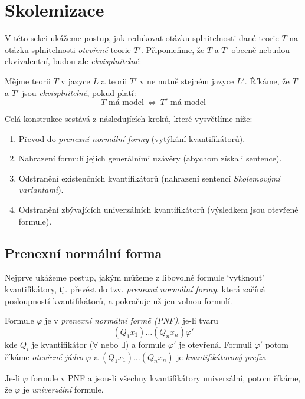 \section{Skolemizace}\label{section:skolemization}

V této sekci ukážeme postup, jak redukovat otázku splnitelnosti dané teorie $T$ na otázku splnitelnosti \emph{otevřené} teorie $T'$. Připomeňme, že $T$ a $T'$ obecně nebudou ekvivalentní, budou ale \emph{ekvisplnitelné}:

\begin{definition}[Ekvisplnitelnost]
Mějme teorii $T$ v jazyce $L$ a teorii $T'$ v ne nutně stejném jazyce $L'$. Říkáme, že $T$ a $T'$ jsou \emph{ekvisplnitelné}, 
pokud platí: 
$$
\text{$T$ má model}\ \Leftrightarrow\ \text{$T'$ má model}
$$
\end{definition}

Celá konstrukce sestává z následujících kroků, které vysvětlíme níže:
\begin{enumerate}
    \item Převod do \emph{prenexní normální formy} (vytýkání kvantifikátorů).
    \item Nahrazení formulí jejich generálními uzávěry (abychom získali sentence).
    \item Odstranění existenčních kvantifikátorů (nahrazení sentencí \emph{Skolemovými variantami}).
    \item Odstranění zbývajících univerzálních kvantifikátorů (výsledkem jsou otevřené formule).
\end{enumerate}

\subsection{Prenexní normální forma}

Nejprve ukážeme postup, jakým můžeme z libovolné formule `vytknout' kvantifikátory, tj. převést do tzv. \emph{prenexní normální formy}, která začíná posloupností kvantifikátorů, a pokračuje už jen volnou formulí.

\begin{definition}[PNF]
    Formule $\varphi$ je v \emph{prenexní normální formě (PNF)}, je-li tvaru
    $$
    (Q_1x_1)\dots(Q_nx_n)\varphi'
    $$
    kde $Q_i$ je kvantifikátor ($\forall$ nebo $\exists$) a formule $\varphi'$ je otevřená. Formuli $\varphi'$ potom říkáme \emph{otevřené jádro} $\varphi$ a $(Q_1x_1)\dots(Q_nx_n)$ je \emph{kvantifikátorový prefix}. 
    
    Je-li $\varphi$ formule v PNF a jsou-li všechny kvantifikátory univerzální, potom říkáme, že $\varphi$ je \emph{univerzální} formule.
\end{definition}

